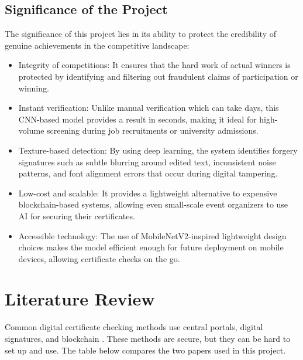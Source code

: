 \documentclass[12pt,a4paper]{article}
\begin{document}
\subsection{Significance of the Project}
The significance of this project lies in its ability to protect the credibility of genuine achievements in the competitive landscape:
\begin{itemize}[leftmargin=*]
    \item Integrity of competitions: It ensures that the hard work of actual winners is protected by identifying and filtering out fraudulent claims of participation or winning.
    \item Instant verification: Unlike manual verification which can take days, this CNN-based model provides a result in seconds, making it ideal for high-volume screening during job recruitments or university admissions.
    \item Texture-based detection: By using deep learning, the system identifies forgery signatures such as subtle blurring around edited text, inconsistent noise patterns, and font alignment errors that occur during digital tampering.
    \item Low-cost and scalable: It provides a lightweight alternative to expensive blockchain-based systems, allowing even small-scale event organizers to use AI for securing their certificates.
    \item Accessible technology: The use of MobileNetV2-inspired lightweight design choices makes the model efficient enough for future deployment on mobile devices, allowing certificate checks on the go.
\end{itemize}

\section{Literature Review}
Common digital certificate checking methods use central portals, digital signatures, and blockchain \cite{fastver2025,semantic2023}. These methods are secure, but they can be hard to set up and use. The table below compares the two papers used in this project.
\end{document}
